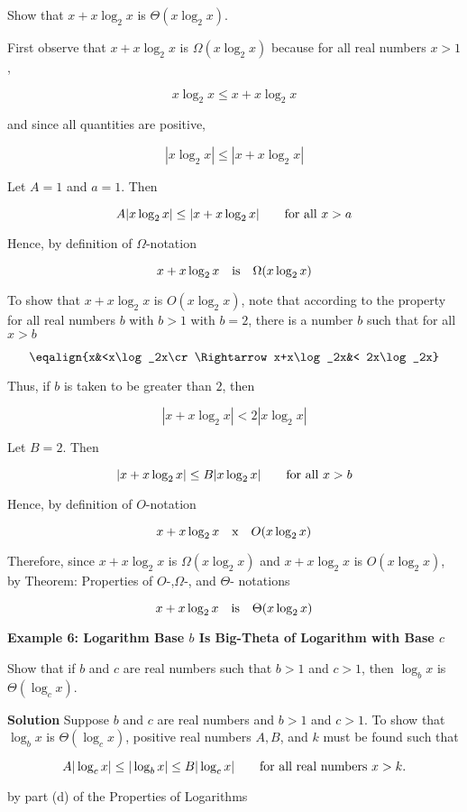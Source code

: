 \vskip 3mm
Show that $x+x\log_2x$ is $\Theta(x\log_2x)$.

\vskip 3mm
First observe that $x+x\log_2x$ is $\Omega(x\log_2x)$ because for all real numbers $x>1$,

$$x\log_2x\leq x+x\log_2x$$

and since all quantities are positive,

$$|x\log_2x|\leq|x+x\log_2x|$$

Let $A=1$ and $a=1$. Then

$$A|x\log_2x|\leq|x+x\log_2x|\qquad\hbox{for all $x>a$}$$

Hence, by definition of $\Omega$-notation

$$x+x\log_2x\quad\hbox{is}\quad\Omega(x\log_2x)$$

To show that $x+x\log_2x$ is $O(x\log_2x)$, note that according to the property for all real numbers $b$ with $b>1$ with $b=2$, there is a number $b$ such that for all $x>b$

$$\eqalign{x&<x\log_2x\cr
	\Rightarrow x+x\log_2x&< 2x\log_2x}$$

Thus, if $b$ is taken to be greater than $2$, then

$$|x+x\log_2x|<2|x\log_2x|$$

Let $B=2$. Then

$$|x+x\log_2x|\leq B|x\log_2x|\qquad\hbox{for all $x>b$}$$

Hence, by definition of $O$-notation

$$x+x\log_2x\quad\hbox{x}\quad O(x\log_2x)$$

Therefore, since $x+x\log_2x$ is $\Omega(x\log_2x)$ and $x+x\log_2x$ is $O(x\log_2x)$, by Theorem: Properties of $O$-,$\Omega$-, and $\Theta$- notations

$$x+x\log_2x\quad\hbox{is}\quad \Theta(x\log_2x)$$

\filbreak
\vskip 1cm
{\bf Example 6: Logarithm Base $b$ Is Big-Theta of Logarithm with Base $c$}

\vskip 3mm
Show that if $b$ and $c$ are real numbers such that $b>1$ and $c>1$, then $\log_bx$ is $\Theta(\log_cx)$.

\vskip 3mm
{\bf Solution}
\vskip 1mm
Suppose $b$ and $c$ are real numbers and $b>1$ and $c>1$. To show that $\log_bx$ is $\Theta(\log_cx)$, positive real numbers $A,B$, and $k$ must be found such that

$$A|\log_cx|\leq|\log_bx|\leq B|\log_cx|\qquad\hbox{for all real numbers $x>k$.}$$

by part (d) of the Properties of Logarithms

